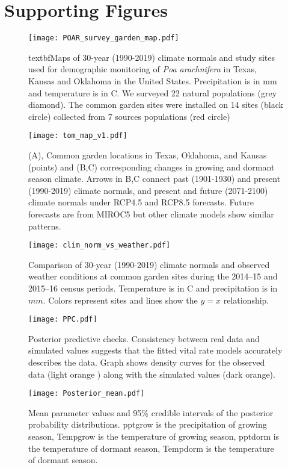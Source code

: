 \documentclass[9pt,twoside,lineno]{pnas-new}
\begin{document}
\section*{Supporting Figures}
\begin{figure}
\centering
\texttt{[image: POAR\_survey\_garden\_map.pdf]}
\caption{textbf{Maps of 30-year (1990-2019) climate normals and study sites used for demographic monitoring of \emph{Poa arachnifera} in Texas, Kansas and Oklahoma in the United States}.
 Precipitation is in mm and temperature is in \degree  C.
 We surveyed 22 natural populations (grey diamond).
 The common garden sites were installed on 14 sites (black circle) collected from 7 sources populations (red circle)}
 \label{Sup:long_lat_garden}
\end{figure}

\begin{figure}
\centering
\texttt{[image: tom\_map\_v1.pdf]}
\caption{(A), Common garden locations in Texas, Oklahoma, and Kansas (points) and (B,C) corresponding changes in growing and dormant season climate. Arrows in B,C connect past (1901-1930) and present (1990-2019) climate normals, and present and future (2071-2100) climate normals under RCP4.5 and RCP8.5 forecasts. Future forecasts are from MIROC5 but other climate models show similar patterns.}
\label{Sup:climate_variation1}
\end{figure}

\begin{figure}
\centering
\texttt{[image: clim\_norm\_vs\_weather.pdf]}
\caption{Comparison of 30-year (1990-2019) climate normals and observed weather conditions at common garden sites during the 2014--15 and 2015--16 census periods. Temperature is in \degree C and precipitation is in $mm$. Colors represent sites and lines show the $y=x$ relationship.}
\label{Sup:climate_normal_weather}
\end{figure}

\begin{figure}
\centering
\texttt{[image: PPC.pdf]}
\caption{Posterior predictive checks. Consistency between real data and simulated values suggests that the fitted vital rate models accurately describes the data. Graph shows density curves for the observed data (light orange ) along with the simulated values (dark orange).}
\label{Sup:PPC}
\end{figure}

\begin{figure}
\centering
\texttt{[image: Posterior\_mean.pdf]}
\caption{Mean parameter values and 95\% credible intervals of the posterior probability distributions. 
		pptgrow is  the precipitation of growing season,
		Tempgrow is the temperature of growing season,
		pptdorm is the temperature of dormant season,
		Tempdorm is the temperature of dormant season.}
\label{Sup:Posterior}
\end{figure}
\end{document}
